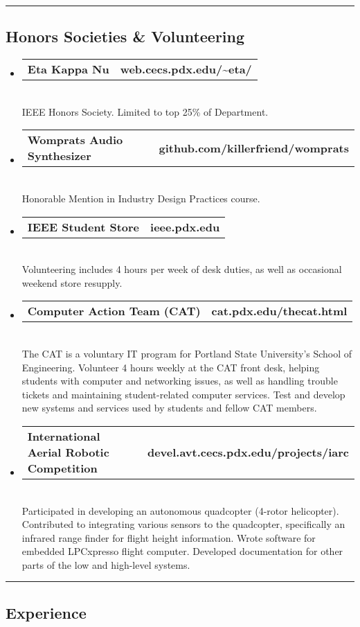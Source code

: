 \documentclass[10pt,letterpaper]{article}
\makeatletter
\newcommand{\headerrow}[2]
{\begin{tabular*}{\linewidth}{l@{\extracolsep{\fill}}r}
	#1 &
	#2 \\
\end{tabular*}}
\makeatother
\begin{document}
\newpage
\hrule
\vspace{-0.4em}
\subsection*{Honors Societies \& Volunteering}
\begin{itemize}
  \item
	\headerrow
		{\textbf{Eta Kappa Nu}}
		{\textbf{web.cecs.pdx.edu/\textasciitilde eta/}}
	\\
  IEEE Honors Society. Limited to top 25\% of Department.

  \item
	\headerrow
		{\textbf{Womprats Audio Synthesizer}}
		{\textbf{github.com/killerfriend/womprats}}
	\\
  Honorable Mention in Industry Design Practices course.
  
  \item
	\headerrow
		{\textbf{IEEE Student Store}}
		{\textbf{ieee.pdx.edu}}
	\\
  Volunteering includes 4 hours per week of desk duties, as well as occasional weekend store resupply.

  \item
  \headerrow
    {\textbf{Computer Action Team (CAT)}}
		{\textbf{cat.pdx.edu/thecat.html}}
	\\
  The CAT is a voluntary IT program for Portland State University's School of Engineering. Volunteer 4 hours weekly at the CAT front desk, helping students with computer and networking issues, as well as handling trouble tickets and maintaining student-related computer services. Test and develop new systems and services used by students and fellow CAT members. 

  \item
  \headerrow
    {\textbf{International Aerial Robotic Competition}}
		{\textbf{devel.avt.cecs.pdx.edu/projects/iarc}}
	\\
  Participated in developing an autonomous quadcopter (4-rotor helicopter). Contributed to integrating various sensors to the quadcopter, specifically an infrared range finder for flight height information. Wrote software for embedded LPCxpresso flight computer. Developed documentation for other parts of the low and high-level systems.
\end{itemize}

\hrule
\vspace{-0.4em}
\subsection*{Experience}
\end{document}
